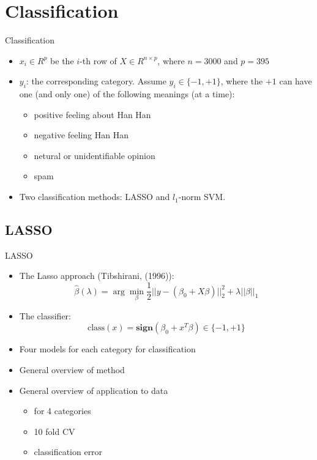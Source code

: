 \documentclass[12pt]{beamer}
\newcommand{\1}[1]{{\mathbf 1}\left\{#1\right\}}        %
\begin{document}
\clearpage 
\section{Classification}

\begin{frame}{Classification}


\begin{itemize}[<+->]


\item $x_i\in R^{p}$ be the $i$-th row of $X\in R^{n\times p}$, where $n=3000$ and $p=395$
\item $y_i$: the corresponding category. Assume $y_i\in\{-1,+1\}$, where the $+1$ can have one (and only one) of the following meanings (at a time):
  \begin{itemize}[<+->]
    \item positive feeling about Han Han
    \item negative feeling Han Han 
    \item netural or unidentifiable opinion 
    \item spam
\end{itemize}
\item Two classification methods: LASSO and $l_1$-norm SVM.
\end{itemize}
\end{frame}
\subsection{LASSO}

\begin{frame}[fragile]{LASSO}
\begin{itemize}[<+->]

\item The Lasso approach (Tibshirani, (1996)):
\[
\hat{\beta}(\lambda) = \arg \min_\beta \frac{1}{2}||y-(\beta_0+X\beta)||_2^2 + \lambda ||\beta||_1
\]
\item The classifier:
\[
\text{class}(x) = \textbf{sign}(\beta_0+x^T\beta)\in\{-1,+1\}
\]

\item Four models for each category for classification
\item General overview of method
\item General overview of application to data
	\begin{itemize}
	\item for 4 categories
	\item 10 fold CV
	\item classification error
	\end{itemize}
	
\end{itemize}

\end{frame}
\end{document}
